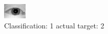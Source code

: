\begin{figure}[h!]
\begin{center}
\includegraphics[width=0.60\columnwidth]{figures/ID1000_class_1_target_2.png}
\end{center}
\caption{ Classification: 1 actual target: 2}
\label{fig:ID1000_class_1_target_2}
\end{figure}
